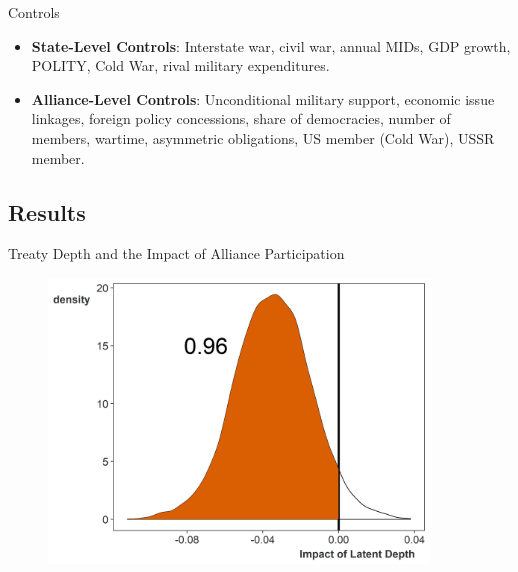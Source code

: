 \documentclass[12pt]{beamer}
\begin{document}

\begin{frame}{Controls}

\begin{itemize}
\item \textbf{State-Level Controls}: Interstate war, civil war, annual MIDs, GDP growth, POLITY, Cold War, rival military expenditures. 
\pause 
\item \textbf{Alliance-Level Controls}: Unconditional military support, economic issue linkages, foreign policy concessions, share of democracies, number of members, wartime, asymmetric obligations, US member (Cold War), USSR member.

\end{itemize} 

\end{frame}



\subsection{Results}


\begin{frame}{Treaty Depth and the Impact of Alliance Participation} 

\begin{figure}
	\centering
		\includegraphics[width=0.90\textwidth]{depth-post.png}
	\label{fig:depth-post}
\end{figure}


\end{frame}
\end{document}

